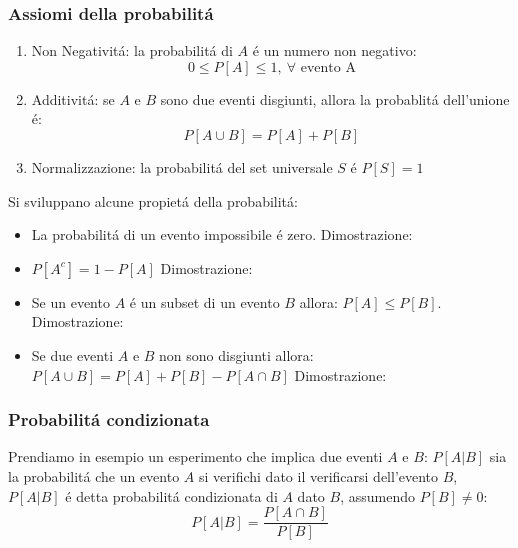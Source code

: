         \subsubsection{Assiomi della probabilitá}
            \begin{enumerate}
                \item \label{Ass. Prob. 1}{Non Negativitá: la probabilitá di $A$ é un numero non negativo:
                    \[
                        0\leq P[A] \leq 1,\ \forall \text{ evento A}
                    \]
                }
                \item \label{Ass. Prob. 2}{Additivitá: se $A$ e $B$ sono due eventi disgiunti, allora la probablitá dell'unione é: 
                    \[
                        P[A\cup B] = P[A] + P[B] 
                    \]
                }
                \item \label{Ass. Prob. 3}{Normalizzazione: la probabilitá del set universale $S$ é $P[S] = 1$}
            \end{enumerate}
            Si sviluppano alcune propietá della probabilitá:
            \begin{itemize}
                \item {
                    La probabilitá di un evento impossibile é zero.
                    Dimostrazione:
                }
                \item {
                    $P[A^c] = 1-P[A]$
                    Dimostrazione:
                }
                \item {
                    Se un evento $A$ é un subset di un evento $B$ allora: $P[A]\leq P[B]$. 
                    Dimostrazione: 
                }
                \item {
                    \begin{sloppypar}
                        Se due eventi $A$ e $B$ non sono disgiunti allora: ${P[A \cup B]= P[A] + P[B] -  P[A\cap B]}$
                        Dimostrazione:
                    \end{sloppypar}
                }
            \end{itemize}
        \subsubsection{Probabilitá condizionata}\label{Probabilitá condizionata}
            Prendiamo in esempio un esperimento che implica due eventi $A$ e $B$: $P[A|B]$ sia la probabilitá che un evento $A$ si verifichi
            dato il verificarsi dell'evento $B$, $P[A|B]$ é detta probabilitá condizionata di $A$ dato $B$, assumendo $P[B]\neq 0$:
            \[
                P[A|B] = \frac{P[A\cap B]}{P[B]}
            \]

